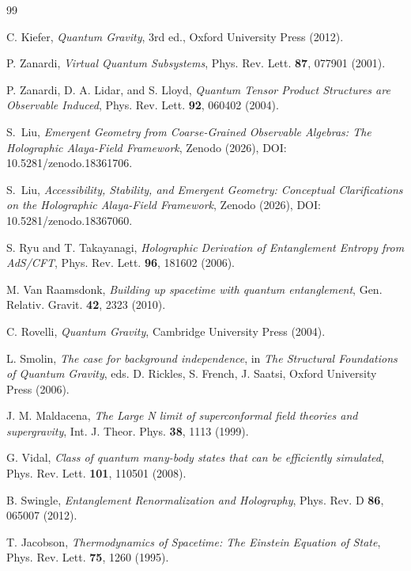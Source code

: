\documentclass[12pt,a4paper]{article}
\begin{document}
\begin{thebibliography}{99}

C. Kiefer, \emph{Quantum Gravity}, 3rd ed., Oxford University Press (2012).

P. Zanardi, \emph{Virtual Quantum Subsystems}, Phys. Rev. Lett. \textbf{87}, 077901 (2001).

P. Zanardi, D. A. Lidar, and S. Lloyd, \emph{Quantum Tensor Product Structures are Observable Induced}, Phys. Rev. Lett. \textbf{92}, 060402 (2004).

S.~Liu, \emph{Emergent Geometry from Coarse-Grained Observable Algebras: The Holographic Alaya-Field Framework}, Zenodo (2026), DOI: 10.5281/zenodo.18361706.

S.~Liu, \emph{Accessibility, Stability, and Emergent Geometry: Conceptual Clarifications on the Holographic Alaya-Field Framework}, Zenodo (2026), DOI: 10.5281/zenodo.18367060.

S. Ryu and T. Takayanagi, \emph{Holographic Derivation of Entanglement Entropy from AdS/CFT}, Phys. Rev. Lett. \textbf{96}, 181602 (2006).

M. Van Raamsdonk, \emph{Building up spacetime with quantum entanglement}, Gen. Relativ. Gravit. \textbf{42}, 2323 (2010).

C. Rovelli, \emph{Quantum Gravity}, Cambridge University Press (2004).

L. Smolin, \emph{The case for background independence}, in \emph{The Structural Foundations of Quantum Gravity}, eds. D. Rickles, S. French, J. Saatsi, Oxford University Press (2006).

J. M. Maldacena, \emph{The Large N limit of superconformal field theories and supergravity}, Int. J. Theor. Phys. \textbf{38}, 1113 (1999).

G. Vidal, \emph{Class of quantum many-body states that can be efficiently simulated}, Phys. Rev. Lett. \textbf{101}, 110501 (2008).

B. Swingle, \emph{Entanglement Renormalization and Holography}, Phys. Rev. D \textbf{86}, 065007 (2012).

T. Jacobson, \emph{Thermodynamics of Spacetime: The Einstein Equation of State}, Phys. Rev. Lett. \textbf{75}, 1260 (1995).


\end{thebibliography}
\end{document}
